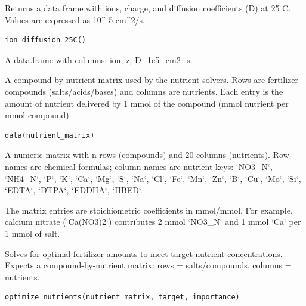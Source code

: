 \documentclass[a4paper]{book}
\begin{document}
%
\begin{Description}
Returns a data frame with ions, charge, and diffusion coefficients (D) at 25 C.
Values are expressed as 10\textasciicircum{}-5 cm\textasciicircum{}2/s.
\end{Description}
%
\begin{Usage}
\begin{verbatim}
ion_diffusion_25C()
\end{verbatim}
\end{Usage}
%
\begin{Value}
A data.frame with columns: ion, z, D\_1e5\_cm2\_s.
\end{Value}
%
\begin{Description}
A compound-by-nutrient matrix used by the nutrient solvers. Rows are fertilizer
compounds (salts/acids/bases) and columns are nutrients. Each entry is the
amount of nutrient delivered by 1 mmol of the compound (mmol nutrient per mmol
compound).
\end{Description}
%
\begin{Usage}
\begin{verbatim}
data(nutrient_matrix)
\end{verbatim}
\end{Usage}
%
\begin{Format}
A numeric matrix with n rows (compounds) and 20 columns (nutrients).
Row names are chemical formulas; column names are nutrient keys:
`NO3\_N`, `NH4\_N`, `P`, `K`, `Ca`, `Mg`, `S`, `Na`, `Cl`, `Fe`, `Mn`, `Zn`,
`B`, `Cu`, `Mo`, `Si`, `EDTA`, `DTPA`, `EDDHA`, `HBED`.
\end{Format}
%
\begin{Details}
The matrix entries are stoichiometric coefficients in mmol/mmol. For example,
calcium nitrate (`Ca(NO3)2`) contributes 2 mmol `NO3\_N` and 1 mmol `Ca` per
1 mmol of salt.
\end{Details}
%
\begin{Description}
Solves for optimal fertilizer amounts to meet target nutrient concentrations.
Expects a compound-by-nutrient matrix: rows = salts/compounds, columns = nutrients.
\end{Description}
%
\begin{Usage}
\begin{verbatim}
optimize_nutrients(nutrient_matrix, target, importance)
\end{verbatim}
\end{Usage}
\end{document}
